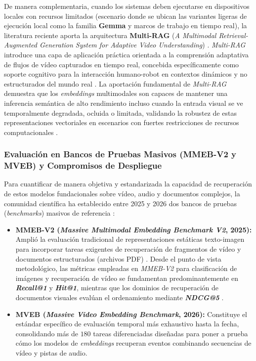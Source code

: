 De manera complementaria, cuando los sistemas deben ejecutarse en dispositivos locales con recursos limitados (escenario donde se ubican las variantes ligeras de ejecución local como la familia \textbf{Gemma} y marcos de trabajo en tiempo real), la literatura reciente aporta la arquitectura \textbf{Multi-RAG} (\textit{A Multimodal Retrieval-Augmented Generation System for Adaptive Video Understanding}) \cite{multi_rag2025}. %
\textit{Multi-RAG} introduce una capa de aplicación práctica orientada a la comprensión adaptativa de flujos de vídeo capturados en tiempo real, concebida específicamente como soporte cognitivo para la interacción humano-robot en contextos dinámicos y no estructurados del mundo real \cite{multi_rag2025}. %
La aportación fundamental de \textit{Multi-RAG} demuestra que los \textit{embeddings} multimodales son capaces de mantener una inferencia semántica de alto rendimiento incluso cuando la entrada visual se ve temporalmente degradada, ocluida o limitada, validando la robustez de estas representaciones vectoriales en escenarios con fuertes restricciones de recursos computacionales \cite{multi_rag2025}. %

\subsubsection{Evaluación en Bancos de Pruebas Masivos (MMEB-V2 y MVEB) y Compromisos de Despliegue}
\label{subsubsec:benchmarks_mmeb_mveb}

Para cuantificar de manera objetiva y estandarizada la capacidad de recuperación de estos modelos fundacionales sobre vídeo, audio y documentos complejos, la comunidad científica ha establecido entre 2025 y 2026 dos bancos de pruebas (\textit{benchmarks}) masivos de referencia \cite{qwen3_vl_emb2026}: %
\begin{itemize}
    \item \textbf{MMEB-V2 (\textit{Massive Multimodal Embedding Benchmark V2}, 2025):} Amplió la evaluación tradicional de representaciones estáticas texto-imagen para incorporar tareas exigentes de recuperación de fragmentos de vídeo y documentos estructurados (archivos PDF) \cite{qwen3_vl_emb2026}. %
    Desde el punto de vista metodológico, las métricas empleadas en \textit{MMEB-V2} para clasificación de imágenes y recuperación de vídeo se fundamentan predominantemente en \textbf{\textit{Recall@1}} y \textbf{\textit{Hit@1}}, mientras que los dominios de recuperación de documentos visuales evalúan el ordenamiento mediante \textbf{\textit{NDCG@5}} \cite{qwen3_vl_emb2026}. %
    \item \textbf{MVEB (\textit{Massive Video Embedding Benchmark}, 2026):} Constituye el estándar específico de evaluación temporal más exhaustivo hasta la fecha, consolidando más de $180$ tareas diferenciadas diseñadas para poner a prueba cómo los modelos de \textit{embeddings} recuperan eventos combinando secuencias de vídeo y pistas de audio. %
\end{itemize}

